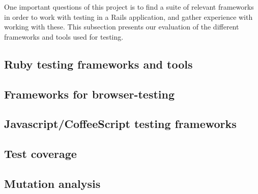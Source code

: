 \MakeShortVerb{\|}
\label{sec:choices}

One important questions of this project is to find a suite of relevant
frameworks in order to work with testing in a Rails application, and
gather experience with working with these. This subsection presents our
evaluation of the different frameworks and tools used for testing.\\

\subsection{Ruby testing frameworks and tools}


\subsection{Frameworks for browser-testing}


\subsection{Javascript/CoffeeScript testing frameworks}


\subsection{Test coverage}


\subsection{Mutation analysis}


